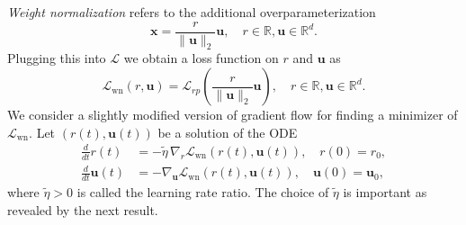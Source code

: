 \documentclass{svproc}
\newcommand{\bu}{\boldsymbol{u}}
\newcommand{\bx}{\boldsymbol{x}}
\newcommand{\0}{\boldsymbol{0}}
\newcommand{\1}{\boldsymbol{1}}
\renewcommand{\tilde}{\widetilde}
\def\R{\mathbb{R}}
\def\Lwn{\mathcal{L}_\text{wn}}
\def\tcont{{t}}
\def\lrr{{\tilde{\eta}}}
\begin{document}
\emph{Weight normalization} refers to the additional overparameterization
\[
\bx = \frac{r}{\|\bu\|_2}\bu, \quad r \in \R, \bu \in \R^d.
\]
Plugging this into $\mathcal{L}$ we obtain
a loss function on $r$ and $\bu$ as
\begin{equation}\label{eq:factorized_loss_weight_normalization}
    \Lwn(r,\bu) = \mathcal{L}_{rp} \left(\frac{r}{\|\bu\|_2}\bu\right), \quad r \in \R, \bu \in \R^d.
\end{equation}
We consider a slightly modified version of
gradient flow for finding a minimizer of $\Lwn$. Let $(r(\tcont),\bu(\tcont))$ be a solution of the ODE
\begin{align}
    \frac{d}{dt}r(t) & = - \lrr \,\nabla_{r}\Lwn(r(t),\bu(t)),\quad r(0) = r_0,\label{eq:dgdt} \\
    \frac{d}{dt}\bu(t) & = -\nabla_{\bu}\Lwn(r(t),\bu(t)),\quad\bu(0) = \bu_0, \label{eq:dwdt}
\end{align}
where $\lrr > 0$ is called the learning rate ratio. The choice of $\lrr$ is important as revealed by the next result.
\end{document}
